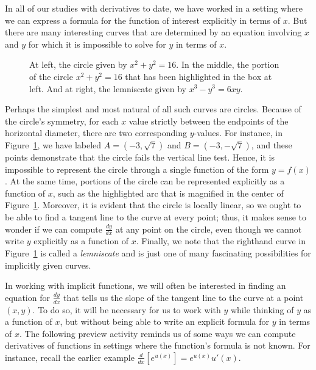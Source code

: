 In all of our studies with derivatives to date, we have worked in a setting where we can express a formula for the function of interest explicitly in terms of $x$.  But there are many interesting curves that are determined by an equation involving $x$ and $y$ for which it is impossible to solve for $y$ in terms of $x$.
\begin{figure}[h]
\begin{center}
\caption{At left, the circle given by $x^2 + y^2 = 16$.  In the middle, the portion of the circle $x^2 + y^2 = 16$ that has been highlighted in the box at left.  And at right, the lemniscate given by $x^3 - y^3 = 6xy$.} \label{F:2.7.Intro}
\end{center}
\end{figure}
Perhaps the simplest and most natural of all such curves are circles.  Because of the circle's symmetry, for each $x$ value strictly between the endpoints of the horizontal diameter, there are two corresponding $y$-values.  For instance, in Figure~\ref{F:2.7.Intro}, we have labeled $A = (-3,\sqrt{7})$ and $B = (-3,-\sqrt{7})$, and these points demonstrate that the circle fails the vertical line test.  Hence, it is impossible to represent the circle through a single function of the form $y = f(x)$.  At the same time, portions of the circle can be represented explicitly as a function of $x$, such as the highlighted arc that is magnified in the center of Figure~\ref{F:2.7.Intro}.  Moreover, it is evident that the circle is locally linear, so we ought to be able to find a tangent line to the curve at every point; thus, it makes sense to wonder if we can compute $\frac{dy}{dx}$ at any point on the circle, even though we cannot write $y$ explicitly as a function of $x$.  Finally, we note that the righthand curve in Figure~\ref{F:2.7.Intro} is called a \emph{lemniscate}  and is just one of many fascinating possibilities for implicitly given curves.

In working with implicit functions, we will often be interested in finding an equation for $\frac{dy}{dx}$ that tells us the slope of the tangent line to the curve at a point $(x,y)$.  To do so, it will be necessary for us to work with $y$ while thinking of $y$ as a function of $x$, but without being able to write an explicit formula for $y$ in terms of $x$.  The following preview activity reminds us of some ways we can compute derivatives of functions in settings where the function's formula is not known.  For instance, recall the earlier example $\frac{d}{dx}[e^{u(x)}] = e^{u(x)}u'(x)$.

